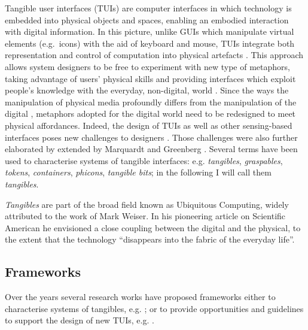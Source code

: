 Tangible user interfaces (TUIs) are computer interfaces in which technology is embedded into physical objects and spaces, enabling an embodied interaction with digital information. In this picture, unlike GUIs which manipulate virtual elements (e.g.~icons) with the aid of keyboard and mouse, TUIs integrate both representation and control of computation into physical artefacts \autocite{krumm2009ubiquitous}. This approach allows system designers to be free to experiment with new type of metaphors, taking advantage of users' physical skills and providing interfaces which exploit people's knowledge with the everyday, non-digital, world \autocite{Jacob:2008vm}. Since the ways the manipulation of physical media profoundly differs from the manipulation of the digital \autocite{Terrenghi:2007uv}, metaphors adopted for the digital world need to be redesigned to meet physical affordances. Indeed, the design of TUIs as well as other sensing-based interfaces poses new challenges to designers \autocite{Bellotti:2002wg}. Those challenges were also further elaborated by extended by Marquardt and Greenberg \autocite*{Marquardt:2012tg}. Several terms have been used to characterise systems of tangible interfaces: e.g. \emph{tangibles}, \emph{graspables}, \emph{tokens}, \emph{containers}, \emph{phicons}, \emph{tangible bits}; in the following I will call them \emph{tangibles}.

\emph{Tangibles} are part of the broad field known as Ubiquitous Computing, widely attributed to the work of Mark Weiser. In his pioneering article on Scientific American \autocite{weiser1991computer} he envisioned a close coupling between the digital and the physical, to the extent that the technology ``disappears into the fabric of the everyday life''.

\subsection{Frameworks}\label{frameworks}

Over the years several research works have proposed frameworks either to characterise systems of tangibles, e.g. \autocites{Fishkin:2004uv}{Jacob:2008vm}{Hornecker:2006uq}; or to provide opportunities and guidelines to support the design of new TUIs, e.g. \autocites{Benford:2005bo}{Shaer:2004ta}{Rogers:2006te}.

